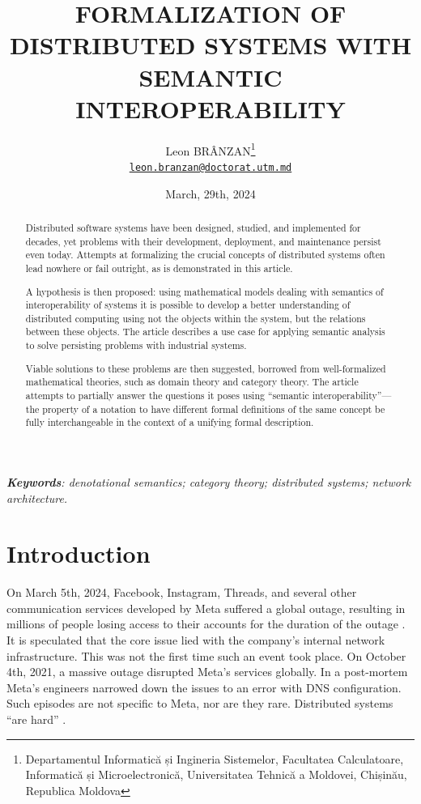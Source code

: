 \documentclass{article}
\title{FORMALIZATION OF DISTRIBUTED SYSTEMS WITH SEMANTIC
INTEROPERABILITY}
\author{Leon BRÂNZAN\thanks{Departamentul Informatică și Ingineria Sistemelor, Facultatea Calculatoare, Informatică și Microelectronică, Universitatea Tehnică a Moldovei, Chișinău, Republica Moldova} \\ \href{mailto:leon.branzan@doctorat.utm.md}{\texttt{leon.branzan@doctorat.utm.md}}}
\date{March, 29th, 2024}
\begin{document}
\maketitle

\begin{abstract}
    Distributed software systems have been designed, studied, and implemented for decades, yet problems with their development, deployment, and maintenance persist even today. Attempts
    at formalizing the crucial concepts of distributed systems often lead nowhere or fail outright, as is
    demonstrated in this article.

    A hypothesis is then proposed: using mathematical models dealing with semantics of interoperability
    of systems it is possible to develop a better understanding of distributed computing using not the objects
    within the system, but the relations between these objects. The article describes a use case for applying
    semantic analysis to solve persisting problems with industrial systems.

    Viable solutions to these problems are then suggested, borrowed from well-formalized
    mathematical theories, such as domain theory and category theory. The article attempts to
    partially answer the questions it poses using “semantic interoperability”---the property of a
    notation to have different formal definitions of the same concept be fully interchangeable in the
    context of a unifying formal description. 
    \end{abstract}
    \textit{\textbf{Keywords}: denotational semantics; category theory; distributed systems; network architecture.}

\tableofcontents

\newpage

\section*{Introduction}

On March 5th, 2024, Facebook, Instagram, Threads, and several other communication
services developed by Meta suffered a global outage, resulting in millions of people losing access
to their accounts for the duration of the outage \cite{Rita}. It is speculated that the core issue lied with the
company’s internal network infrastructure. This was not the first time such an event took place.
On October 4th, 2021, a massive outage disrupted Meta’s services globally. In a post-mortem \cite{Janardhan}
Meta’s engineers narrowed down the issues to an error with DNS configuration. Such episodes are
not specific to Meta, nor are they rare. Distributed systems “are hard” \cite{Kingsbury}.
\end{document}

